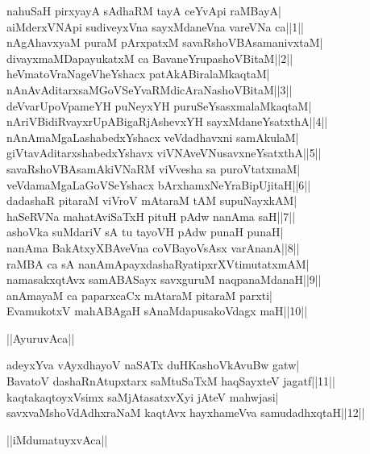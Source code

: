 \documentclass{article}
\begin{document}
nahuSaH pirxyayA sAdhaRM tayA ceYvApi raMBayA|\\
aiMderxVNApi sudiveyxVna sayxMdaneVna vareVNa ca||1||\\
nAgAhavxyaM puraM pArxpatxM savaRshoVBAsamanivxtaM|\\
divayxmaMDapayukatxM ca BavaneYrupashoVBitaM||2||\\
heVmatoVraNageVheYshacx patAkABiralaMkaqtaM|\\
nAnAvAditarxsaMGoVSeYvaRMdicAraNashoVBitaM||3||\\
deVvarUpoVpameYH puNeyxYH puruSeYsasxmalaMkaqtaM|\\
nAriVBidiRvayxrUpABigaRjAshevxYH sayxMdaneYsatxthA||4||\\
nAnAmaMgaLashabedxYshacx veVdadhavxni samAkulaM|\\
giVtavAditarxshabedxYshavx viVNAveVNusavxneYsatxthA||5||\\
savaRshoVBAsamAkiVNaRM viVvesha sa puroVtatxmaM|\\
veVdamaMgaLaGoVSeYshacx bArxhamxNeYraBipUjitaH||6||\\
dadashaR pitaraM viVroV mAtaraM tAM supuNayxkAM|\\
haSeRVNa mahatAviSaTxH pituH pAdw nanAma saH||7||\\
ashoVka suMdariV sA tu tayoVH pAdw punaH punaH|\\
nanAma BakAtxyXBAveVna coVBayoVsAsx varAnanA||8||\\
raMBA ca sA nanAmApayxdashaRyatipxrXVtimutatxmAM|\\
namasakxqtAvx samABASayx savxguruM naqpanaMdanaH||9||\\
anAmayaM ca paparxcaCx mAtaraM pitaraM parxti|\\
EvamukotxV mahABAgaH sAnaMdapusakoVdagx maH||10||\\

\begin{center}
||AyuruvAca||
\end{center}

adeyxYva vAyxdhayoV naSATx duHKashoVkAvuBw gatw|\\
BavatoV dashaRnAtupxtarx saMtuSaTxM haqSayxteV jagatf||11||\\
kaqtakaqtoyxVsimx saMjAtasatxvXyi jAteV mahwjasi|\\
savxvaMshoVdAdhxraNaM kaqtAvx hayxhameVva samudadhxqtaH||12||\\

\begin{center}
||iMdumatuyxvAca||
\end{center}
\end{document}
